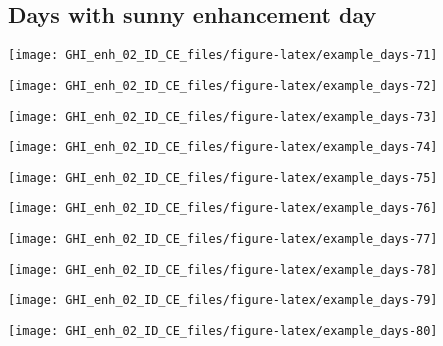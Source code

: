 \documentclass[
  10pt,
  a4paper,oneside]{article}
\begin{document}
\FloatBarrier

\hypertarget{days-with-sunny-enhancement-day}{%
\subsection{Days with sunny enhancement day}\label{days-with-sunny-enhancement-day}}

\begin{center}\texttt{[image: GHI\_enh\_02\_ID\_CE\_files/figure-latex/example\_days-71]} \end{center}

\begin{center}\texttt{[image: GHI\_enh\_02\_ID\_CE\_files/figure-latex/example\_days-72]} \end{center}

\begin{center}\texttt{[image: GHI\_enh\_02\_ID\_CE\_files/figure-latex/example\_days-73]} \end{center}

\begin{center}\texttt{[image: GHI\_enh\_02\_ID\_CE\_files/figure-latex/example\_days-74]} \end{center}

\begin{center}\texttt{[image: GHI\_enh\_02\_ID\_CE\_files/figure-latex/example\_days-75]} \end{center}

\begin{center}\texttt{[image: GHI\_enh\_02\_ID\_CE\_files/figure-latex/example\_days-76]} \end{center}

\begin{center}\texttt{[image: GHI\_enh\_02\_ID\_CE\_files/figure-latex/example\_days-77]} \end{center}

\begin{center}\texttt{[image: GHI\_enh\_02\_ID\_CE\_files/figure-latex/example\_days-78]} \end{center}

\begin{center}\texttt{[image: GHI\_enh\_02\_ID\_CE\_files/figure-latex/example\_days-79]} \end{center}

\begin{center}\texttt{[image: GHI\_enh\_02\_ID\_CE\_files/figure-latex/example\_days-80]} \end{center}
\end{document}
